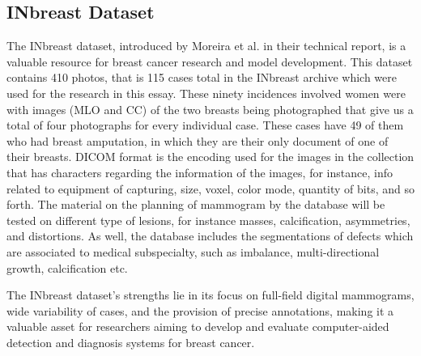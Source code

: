\subsection{INbreast Dataset}
The INbreast dataset, introduced by Moreira et al. \cite{Inbreast} in their technical report, is a valuable resource for breast cancer research and model development. This dataset contains 410 photos, that is 115 cases total in the INbreast archive which were used for the research in this essay. These ninety incidences involved women were with images (MLO and CC) of the two breasts being photographed that give us a total of four photographs for every individual case. These cases have 49 of them who had breast amputation, in which they are their only document of one of their breasts. DICOM format is the encoding used for the images in the collection that has characters regarding the information of the images, for instance, info related to equipment of capturing, size, voxel, color mode, quantity of bits, and so forth. The material on the planning of mammogram by the database will be tested on different type of lesions, for instance masses, calcification, asymmetries, and distortions. As well, the database includes the segmentations of defects which are associated to medical subspecialty, such as imbalance, multi-directional growth, calcification etc.

The INbreast dataset's strengths lie in its focus on full-field digital mammograms, wide variability of cases, and the provision of precise annotations, making it a valuable asset for researchers aiming to develop and evaluate computer-aided detection and diagnosis systems for breast cancer.
